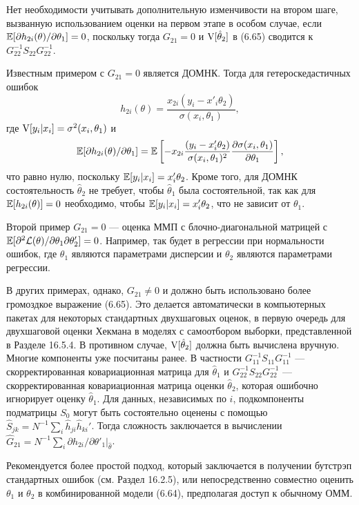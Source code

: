 Нет необходимости учитывать дополнительную изменчивости на втором шаге, вызванную использованием оценки на первом этапе в особом случае, если $\mathbb{E}[\partial h_{2i} (\theta) / \partial \theta_1]=0$, поскольку тогда $G_{21}=0$ и $\mathrm{V}[\hat{\theta}_2]$ в (6.65) сводится к $G^{-1}_{22} S_{22} G^{-1}_{22}$.

Известным примером с $G_{21}=0$ является ДОМНК. Тогда для гетероскедастичных ошибок
\[
h_{2i}(\theta)= \frac{x_{2i}(y_i-x'_i \theta_2)}{\sigma(x_i, \theta_1)},
\]
где $\mathrm{V}[y_i|x_i]=\sigma^2(x_i, \theta_1)$ и
\[
\mathbb{E}[\partial h_{2i} (\theta) / \partial \theta_1] =\mathbb{E} \left[ -x_{2i} \frac{(y_i-x'_i \theta_2)}{\sigma(x_i, \theta_1)^2} \frac{\partial \sigma(x_i, \theta_1)}{\partial \theta_1} \right],
\]
что равно нулю, поскольку $\mathbb{E}[y_i|x_i]=x'_i \theta_2$. Кроме того, для ДОМНК состоятельность $\hat{\theta}_2$ не требует, чтобы $\hat{\theta}_1$ была состоятельной, так как для $\mathbb{E}[h_{2i}(\theta)]=0$ необходимо, чтобы $\mathbb{E}[y_i|x_i]=x'_i \theta_2$, что не зависит от $\theta_1$.

Второй пример $G_{21}=0$ --- оценка ММП с блочно-диагональной матрицей с $\mathbb{E}[\partial^2 \mathcal{L}(\theta) / \partial \theta_1 \partial \theta'_2]=0$. Например, так будет в регрессии при нормальности ошибок, где $\theta_1$ являются параметрами дисперсии и $\theta_2$ являются параметрами регрессии.

В других примерах, однако, $G_{21} \not = 0$ и должно быть использовано более громоздкое выражение (6.65). Это делается автоматически в компьютерных пакетах для некоторых стандартных двухшаговых оценок, в первую очередь для двухшаговой оценки Хекмана в моделях с самоотбором выборки, представленной в Разделе 16.5.4. В противном случае, $\mathrm{V}[\hat{\theta}_2]$ должна быть вычислена вручную. Многие компоненты уже посчитаны ранее. В частности $G^{-1}_{11} S_{11} G^{-1}_{11}$ --- скорректированная ковариационная матрица для $\hat{\theta}_1$ и $G^{-1}_{22} S_{22} G^{-1}_{22}$ --- скорректированная ковариационная матрица оценки $\hat{\theta}_2$, которая ошибочно игнорирует оценку $\hat{\theta}_1$. Для данных, независимых по $i$, подкомпоненты подматрицы $S_0$ могут быть состоятельно оценены с помощью $\hat{S}_{jk}= N^{-1} \sum_i \hat{h}_{ji} \hat{h}_{ki}'$. Тогда сложность заключается в вычислении $\hat{G}_{21}= N^{-1} \sum_i \partial h_{2i} / \partial \theta'_1|_{\hat{\theta}}$.

Рекомендуется более простой подход, который заключается в получении бутстрэп стандартных ошибок (см. Раздел 16.2.5), или непосредственно совместно оценить $\theta_1$ и $\theta_2$ в комбинированной модели (6.64), предполагая доступ к обычному ОММ.

